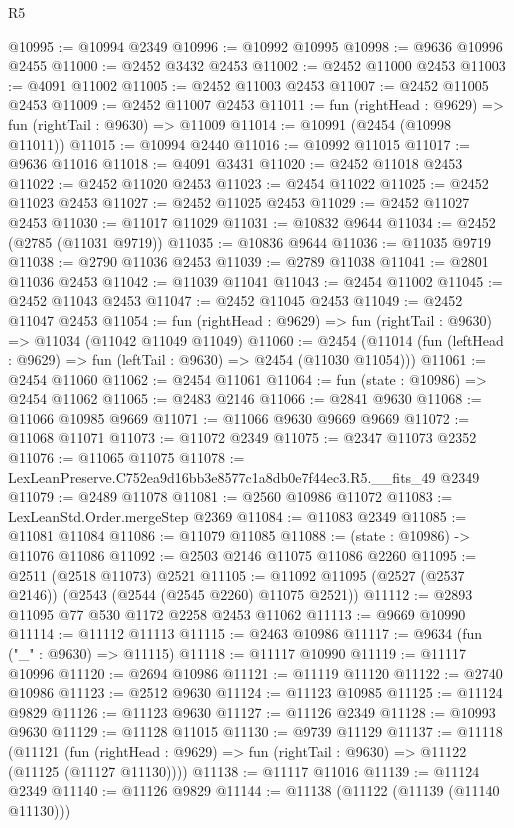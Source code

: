 \begin{lexlean}{R5}
\begin{coremodule}
@10995 := @10994 @2349
@10996 := @10992 @10995
@10998 := @9636 @10996 @2455
@11000 := @2452 @3432 @2453
@11002 := @2452 @11000 @2453
@11003 := @4091 @11002
@11005 := @2452 @11003 @2453
@11007 := @2452 @11005 @2453
@11009 := @2452 @11007 @2453
@11011 := fun (rightHead : @9629) => fun (rightTail : @9630) => @11009
@11014 := @10991 (@2454 (@10998 @11011))
@11015 := @10994 @2440
@11016 := @10992 @11015
@11017 := @9636 @11016
@11018 := @4091 @3431
@11020 := @2452 @11018 @2453
@11022 := @2452 @11020 @2453
@11023 := @2454 @11022
@11025 := @2452 @11023 @2453
@11027 := @2452 @11025 @2453
@11029 := @2452 @11027 @2453
@11030 := @11017 @11029
@11031 := @10832 @9644
@11034 := @2452 (@2785 (@11031 @9719))
@11035 := @10836 @9644
@11036 := @11035 @9719
@11038 := @2790 @11036 @2453
@11039 := @2789 @11038
@11041 := @2801 @11036 @2453
@11042 := @11039 @11041
@11043 := @2454 @11002
@11045 := @2452 @11043 @2453
@11047 := @2452 @11045 @2453
@11049 := @2452 @11047 @2453
@11054 := fun (rightHead : @9629) => fun (rightTail : @9630) => @11034 (@11042 @11049 @11049)
@11060 := @2454 (@11014 (fun (leftHead : @9629) => fun (leftTail : @9630) => @2454 (@11030 @11054)))
@11061 := @2454 @11060
@11062 := @2454 @11061
@11064 := fun (state : @10986) => @2454 @11062
@11065 := @2483 @2146
@11066 := @2841 @9630
@11068 := @11066 @10985 @9669
@11071 := @11066 @9630 @9669 @9669
@11072 := @11068 @11071
@11073 := @11072 @2349
@11075 := @2347 @11073 @2352
@11076 := @11065 @11075
@11078 := LexLeanPreserve.C752ea9d16bb3e8577c1a8db0e7f44ec3.R5.__fits_49 @2349
@11079 := @2489 @11078
@11081 := @2560 @10986 @11072
@11083 := LexLeanStd.Order.mergeStep @2369
@11084 := @11083 @2349
@11085 := @11081 @11084
@11086 := @11079 @11085
@11088 := (state : @10986) -> @11076 @11086
@11092 := @2503 @2146 @11075 @11086 @2260
@11095 := @2511 (@2518 @11073) @2521
@11105 := @11092 @11095 (@2527 (@2537 @2146)) (@2543 (@2544 (@2545 @2260) @11075 @2521))
@11112 := @2893 @11095 @77 @530 @1172 @2258 @2453 @11062
@11113 := @9669 @10990
@11114 := @11112 @11113
@11115 := @2463 @10986
@11117 := @9634 (fun ("_" : @9630) => @11115)
@11118 := @11117 @10990
@11119 := @11117 @10996
@11120 := @2694 @10986
@11121 := @11119 @11120
@11122 := @2740 @10986
@11123 := @2512 @9630
@11124 := @11123 @10985
@11125 := @11124 @9829
@11126 := @11123 @9630
@11127 := @11126 @2349
@11128 := @10993 @9630
@11129 := @11128 @11015
@11130 := @9739 @11129
@11137 := @11118
    (@11121 (fun (rightHead : @9629) => fun (rightTail : @9630) => @11122 (@11125 (@11127 @11130))))
@11138 := @11117 @11016
@11139 := @11124 @2349
@11140 := @11126 @9829
@11144 := @11138 (@11122 (@11139 (@11140 @11130)))

\end{coremodule}
\end{lexlean}
